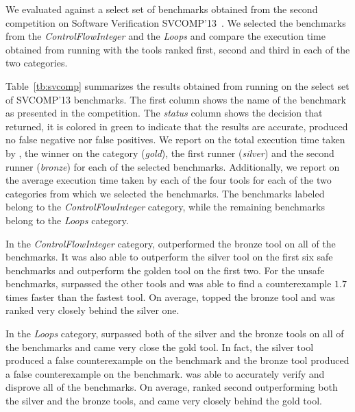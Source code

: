 We evaluated \mytool{} against a select set of benchmarks obtained from the
second competition on Software Verification SVCOMP'13~\cite{svcomp}.
We selected the benchmarks from the {\em ControlFlowInteger} and the {\em Loops}
and compare the execution time obtained from running \mytool{} with the 
tools ranked first, second and third in each of the two categories. 



Table~\ref{tb:svcomp} summarizes the results obtained from running \mytool{} on the
select set of SVCOMP'13 benchmarks. The first column shows the name of the 
benchmark as presented in the competition. The {\em status} column shows the decision 
that \mytool{} returned, it is colored in green to indicate that the results are accurate, \ie
\mytool{} produced no false negative nor false positives. 
We report on the total execution time taken by \mytool{}, the winner on the category ({\em gold}),
the first runner ({\em silver}) and the second runner ({\em bronze}) for each of the selected
benchmarks. Additionally, we report on the average execution time taken by each of the four 
tools for each of the two categories from which we selected the benchmarks. 
The benchmarks labeled  belong to the {\em ControlFlowInteger} category,
while the remaining benchmarks belong to the {\em Loops} category. 

In the {\em ControlFlowInteger} category, \mytool{} outperformed the bronze tool 
on all of the benchmarks. It was also able to outperform the silver tool
on the first six safe benchmarks and outperform the golden tool on the 
first two. For the unsafe benchmarks, \mytool{} surpassed the other tools 
and was able to find a counterexample $1.7$ times faster than the fastest tool.
On average, \mytool{} topped the bronze tool and was ranked very closely behind
the silver one. 

In the {\em Loops} category, \mytool{} surpassed both of the silver and the 
bronze tools on all of the benchmarks and came very close the gold tool.
In fact, the silver tool produced a false counterexample on the 
benchmark and the bronze tool produced a false counterexample on the 
benchmark. \mytool{} was able to accurately verify and disprove all of the benchmarks. 
On average, \mytool{} ranked second outperforming both the silver and the bronze tools, and
came very closely behind the gold tool. 